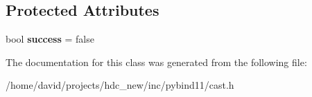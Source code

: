 \subsection*{Protected Attributes}
\begin{DoxyCompactItemize}
\item 
bool {\bfseries success} = false\hypertarget{classtype__caster_3_01std_1_1wstring_01_4_a5b96df66e4d28844cc787255de6bdaeb}{}\label{classtype__caster_3_01std_1_1wstring_01_4_a5b96df66e4d28844cc787255de6bdaeb}

\end{DoxyCompactItemize}


The documentation for this class was generated from the following file\+:\begin{DoxyCompactItemize}
\item 
/home/david/projects/hdc\+\_\+new/inc/pybind11/cast.\+h\end{DoxyCompactItemize}
